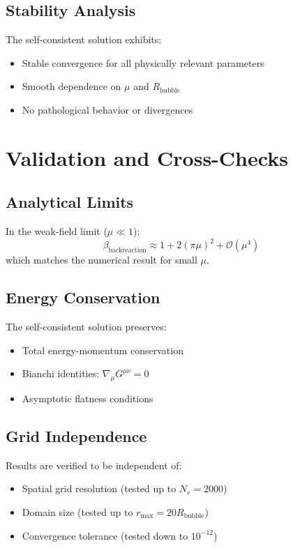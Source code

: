 \documentclass[11pt,a4paper]{article}
\begin{document}
\subsection{Stability Analysis}

The self-consistent solution exhibits:
\begin{itemize}
\item Stable convergence for all physically relevant parameters
\item Smooth dependence on $\mu$ and $R_{\text{bubble}}$
\item No pathological behavior or divergences
\end{itemize}

\section{Validation and Cross-Checks}

\subsection{Analytical Limits}

In the weak-field limit ($\mu \ll 1$):
\begin{equation}
\beta_{\text{backreaction}} \approx 1 + 2(\pi\mu)^2 + \mathcal{O}(\mu^4)
\end{equation}
which matches the numerical result for small $\mu$.

\subsection{Energy Conservation}

The self-consistent solution preserves:
\begin{itemize}
\item Total energy-momentum conservation
\item Bianchi identities: $\nabla_\mu G^{\mu\nu} = 0$
\item Asymptotic flatness conditions
\end{itemize}

\subsection{Grid Independence}

Results are verified to be independent of:
\begin{itemize}
\item Spatial grid resolution (tested up to $N_r = 2000$)
\item Domain size (tested up to $r_{\max} = 20 R_{\text{bubble}}$)
\item Convergence tolerance (tested down to $10^{-12}$)
\end{itemize}
\end{document}
